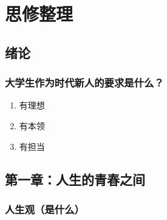 \hypertarget{ux601dux4feeux6574ux7406}{%
\section{思修整理}\label{ux601dux4feeux6574ux7406}}

\hypertarget{ux7eeaux8bba}{%
\subsection{绪论}\label{ux7eeaux8bba}}

\hypertarget{ux5927ux5b66ux751fux4f5cux4e3aux65f6ux4ee3ux65b0ux4ebaux7684ux8981ux6c42ux662fux4ec0ux4e48}{%
\subsubsection{大学生作为时代新人的要求是什么？}\label{ux5927ux5b66ux751fux4f5cux4e3aux65f6ux4ee3ux65b0ux4ebaux7684ux8981ux6c42ux662fux4ec0ux4e48}}

\begin{enumerate}
\def\labelenumi{\arabic{enumi}.}
\tightlist
\item
  有理想
\item
  有本领
\item
  有担当
\end{enumerate}

\hypertarget{ux7b2cux4e00ux7ae0ux4ebaux751fux7684ux9752ux6625ux4e4bux95f4}{%
\subsection{第一章：人生的青春之间}\label{ux7b2cux4e00ux7ae0ux4ebaux751fux7684ux9752ux6625ux4e4bux95f4}}

\hypertarget{ux4ebaux751fux89c2ux662fux4ec0ux4e48}{%
\subsubsection{人生观（是什么）}\label{ux4ebaux751fux89c2ux662fux4ec0ux4e48}}

